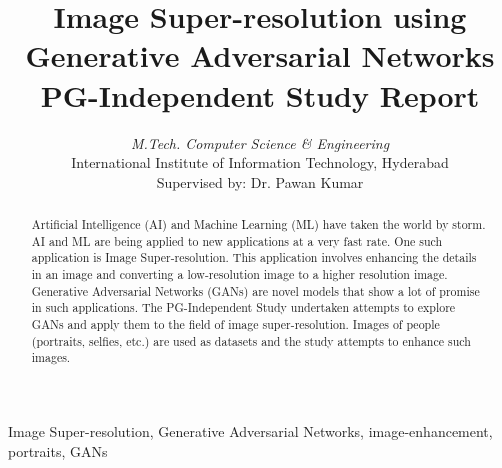 \documentclass[conference]{IEEEtran}
\begin{document}
	
	\title{Image Super-resolution using \\ Generative Adversarial Networks\\
		{\large PG-Independent Study Report}
		\vspace{-3mm}
	}

	
	\author{
			\textit{M.Tech. Computer Science \& Engineering}\\
			International Institute of Information Technology, Hyderabad \\
				Supervised by: Dr. Pawan Kumar
		}
		
	
	\maketitle
	
	\begin{abstract}
		Artificial Intelligence (AI) and Machine Learning (ML) have taken the world by storm. AI and ML are being applied to new applications at a very fast rate. One such application is Image Super-resolution. This application involves enhancing the details in an image and converting a low-resolution image to a higher resolution image. Generative Adversarial Networks (GANs) are novel models that show a lot of promise in such applications. The PG-Independent Study undertaken attempts to explore GANs and apply them to the field of image super-resolution. Images of people (portraits, selfies, etc.) are used as datasets and the study attempts to enhance such images.
	\end{abstract}
	
	\begin{IEEEkeywords}
		Image Super-resolution, Generative Adversarial Networks, image-enhancement, portraits, GANs
	\end{IEEEkeywords}
	
\end{document}
